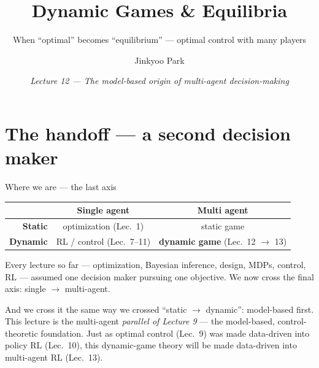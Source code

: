 \documentclass[10pt, aspectratio=169]{beamer}
\title{Dynamic Games \& Equilibria}
\subtitle{When ``optimal'' becomes ``equilibrium'' --- optimal control with many players}
\author{Jinkyoo Park}
\institute{KAIST}
\date{\textit{Lecture 12 --- The model-based origin of multi-agent decision-making}}
\begin{document}
\maketitle

\section{The handoff --- a second decision maker}

\begin{frame}{Where we are --- the last axis}
\vspace{2pt}
\begin{center}\footnotesize\renewcommand{\arraystretch}{1.45}
\begin{tabular}{r|c|c}
 & \textbf{Single agent} & \textbf{Multi agent} \\
\hline
\textbf{Static}  & optimization \scriptsize(Lec.\ 1) & static game \\
\hline
\textbf{Dynamic} & RL / control \scriptsize(Lec.\ 7--11) & \cellcolor{mDarkTeal!20}\textbf{dynamic game} \scriptsize(\alert{Lec.\ 12} $\to$ 13)\\
\end{tabular}
\end{center}
\smallskip

Every lecture so far --- optimization, Bayesian inference, design, MDPs, control, RL --- assumed \alert{one decision maker} pursuing \alert{one objective}. We now cross the final axis: \alert{single $\to$ multi-agent}.
\smallskip

\pause
And we cross it the same way we crossed ``static $\to$ dynamic'': \alert{model-based first}. This lecture is the multi-agent \emph{parallel of Lecture 9} --- the model-based, control-theoretic foundation. Just as optimal control (Lec.\ 9) was made data-driven into policy RL (Lec.\ 10), this dynamic-game theory will be made data-driven into multi-agent RL (Lec.\ 13).
\end{frame}
\end{document}
